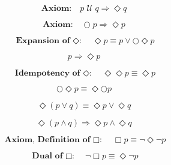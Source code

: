 \documentclass[fleqn, leqno]{article}
\newcommand{\until}{\;\mathcal{U}\;}
\newcommand{\next}{\bigcirc}
\newcommand{\event}{\Diamond}
\newcommand{\always}{\Box}
\newcommand{\spacer}{\vspace{-30pt}}
\begin{document}
\spacer

\begin{equation}\label{E:untilImpEvent}
\textbf{Axiom:}\quad p \until q \Rightarrow \event q
\end{equation}

\spacer

\begin{equation}\label{E:nextEvent}
\textbf{Axiom:}\quad \next p \Rightarrow \event p
\end{equation}

\spacer

\begin{equation}\label{E:expansionEvent}
\textbf{Expansion of $\event$:}\quad \event p \equiv p \lor \next\event p
\end{equation}

\spacer

\begin{equation}\label{E:impEvent}
p \Rightarrow \event p
\end{equation}

\spacer

\begin{equation}\label{E:IdemEvent}
\textbf{Idempotency of $\event$:}\quad \event\event p \equiv \event p
\end{equation}

\spacer

\begin{equation}\label{E:dNextEvent}
\next\event p \equiv \event\next p
\end{equation}

\spacer

\begin{equation}\label{E:distEventOr}
\event(p \lor q) \equiv \event p \lor \event q
\end{equation}

\spacer

\begin{equation}\label{E:distEventAnd}
\event(p \land q) \Rightarrow \event p \land \event q
\end{equation}

\spacer

\begin{equation}\label{E:defAlways}
\textbf{Axiom, Definition of $\always$:}\quad \always p \equiv \lnot\event\lnot p
\end{equation}

\spacer

\begin{equation}\label{E:dualAlways}
\textbf{Dual of $\always$:}\quad \lnot\always p \equiv \event\lnot p
\end{equation}
\end{document}
